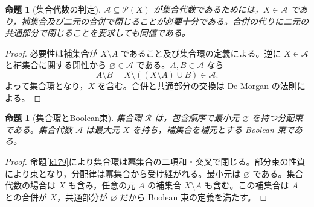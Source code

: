 \documentclass[a5paper,10pt,dvipdfmx]{jsarticle}
\theoremstyle{definition}
\theoremstyle{plain}
\newtheorem{prop}[ruledef]{命題}
\newcommand{\Pow}{\mathcal{P}}
\newcommand{\GenronRefText}[2]{#2}
\begin{document}
\begin{prop}[集合代数の判定]\label{k180}
$\mathcal A\subseteq\Pow(X)$ が集合代数であるためには，$X\in\mathcal A$ であり，補集合及び二元の合併で閉じることが必要十分である。合併の代りに二元の共通部分で閉じることを要求しても同値である。
\end{prop}
\begin{proof}
必要性は補集合が $X\setminus A$ であること及び集合環の定義による。逆に $X\in\mathcal A$ と補集合に関する閉性から $\varnothing\in\mathcal A$ である。$A,B\in\mathcal A$ なら
\[A\setminus B=X\setminus((X\setminus A)\cup B)\in\mathcal A.\]
よって集合環となり，$X$ を含む。合併と共通部分の交換は De Morgan の法則による。
\end{proof}
\begin{prop}[集合環とBoolean束]\label{k181}
集合環 $\mathcal R$ は，包含順序で最小元 $\varnothing$ を持つ分配束である。集合代数 $\mathcal A$ は最大元 $X$ を持ち，補集合を補元とする Boolean 束である。
\end{prop}
\begin{proof}
命題\ref{k179}により集合環は冪集合の二項和・交叉で閉じる。\GenronRefText{K-000083}{部分束の性質}により束となり，分配律は冪集合から受け継がれる。最小元は $\varnothing$ である。集合代数の場合は $X$ も含み，任意の元 $A$ の補集合 $X\setminus A$ も含む。この補集合は $A$ との合併が $X$，共通部分が $\varnothing$ だから \GenronRefText{K-000089}{Boolean 束の定義}を満たす。
\end{proof}
\end{document}
